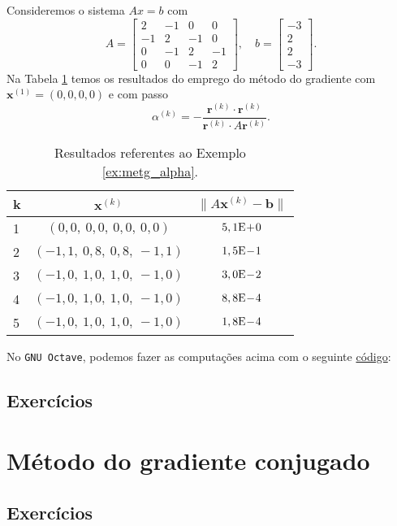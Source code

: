 \begin{ex}\label{ex:metg_alpha}
  Consideremos o sistema $Ax = b$ com
  \begin{equation}
    A =
    \begin{bmatrix}
      2 & -1 & 0 & 0\\
      -1 & 2 & -1 & 0\\
      0 & -1 & 2 & -1 \\
      0 & 0 & -1 & 2
    \end{bmatrix},\quad
    b =
    \begin{bmatrix}
      -3\\
      2\\
      2\\
      -3
    \end{bmatrix}.
  \end{equation}
  Na Tabela \ref{tab:metg_alpha} temos os resultados do emprego do método do gradiente com $\pmb{x}^{(1)} = (0, 0, 0, 0)$ e com passo
  \begin{equation}
    \alpha^{(k)} = - \frac{\pmb{r}^{(k)}\cdot\pmb{r}^{(k)}}{\pmb{r}^{(k)}\cdot A\pmb{r}^{(k)}}.
\end{equation}

  \begin{table}[h!]
    \centering
    \begin{tabular}{l|c|c}
      k & $\pmb{x}^{(k)}$ & $\|A\pmb{x}^{(k)}-\pmb{b}\|$\\\hline
      1 & $(0,0,~0,0,~0,0,~0,0)$ & $5,1\mathrm{E}\!+\!0$\\
      2 & $(-1,1,~0,8,~0,8,~-1,1)$ & $1,5\mathrm{E}\!-\!1$\\
      3 & $(-1,0,~1,0,~1,0,~-1,0)$ & $3,0\mathrm{E}\!-\!2$\\
      4 & $(-1,0,~1,0,~1,0,~-1,0)$ & $8,8\mathrm{E}\!-\!4$\\
      5 & $(-1,0,~1,0,~1,0,~-1,0)$ & $1,8\mathrm{E}\!-\!4$\\\hline
    \end{tabular}
    \caption{Resultados referentes ao Exemplo \ref{ex:metg_alpha}.}
    \label{tab:metg_alpha}
  \end{table}

\ifisoctave
No \verb+GNU Octave+, podemos fazer as computações acima com o seguinte \href{https://github.com/phkonzen/notas/blob/master/src/MatematicaNumerica/cap_sl_iter/dados/ex_metg_alpha/ex_metg_alpha.m}{código}:

\fi
\end{ex}

\subsection*{Exercícios}

\emconstrucao

\section{Método do gradiente conjugado}\label{cap_sl_iter_sec_metgc}

\emconstrucao

\subsection*{Exercícios}

\emconstrucao